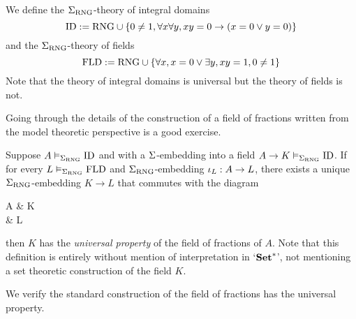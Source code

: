 \begin{dfn}
    We define the $\Sigma_{\mathrm{RNG}}$-theory of integral domains
    \[\operatorname{ID} := \mathrm{RNG} \cup \left\{0 \ne 1,
    \forall x \forall y, xy = 0 \to (x = 0 \lor y = 0)\right\}\]
    and the $\Sigma_{\mathrm{RNG}}$-theory of fields
    \[\operatorname{FLD} := \mathrm{RNG} \cup \left\{\forall x, x = 0 \lor \exists y, xy = 1, 0 \ne 1\right\}\]
    Note that the theory of integral domains is universal but the 
    theory of fields is not.
\end{dfn}

Going through the details of the construction of a field of fractions 
written from the model theoretic perspective
is a good exercise.
\begin{dfn}
    Suppose $A \vDash_{\Sigma_{\mathrm{RNG}}} \operatorname{ID}$ and with a $\Sigma$-embedding 
    into a field $A \to K \vDash_{\Sigma_{\mathrm{RNG}}} \operatorname{ID}$.
    If for every $L \vDash_{\Sigma_{\mathrm{RNG}}} \operatorname{FLD}$ and 
    $\Sigma_{\mathrm{RNG}}$-embedding $\iota_L : A \to L$, 
    there exists a unique $\Sigma_{\mathrm{RNG}}$-embedding $K \to L$
    that commutes with the diagram
    \begin{cd}
        A \ar[r] \ar[dr] & K \ar[d, dashed]\\
        & L
    \end{cd}
    then $K$ has the \textit{universal property} 
    of the field of fractions of $A$.
    Note that this definition is entirely without mention of interpretation 
    in `$\mathbf{Set}^*$', not mentioning a set theoretic construction of the field 
    $K$.

    We verify the standard construction of the field of fractions 
    has the universal property.
\end{dfn}
